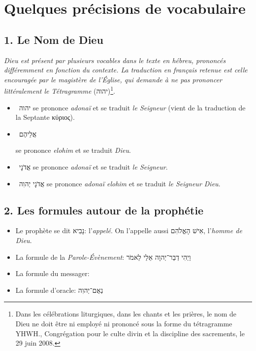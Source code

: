 \noindent
\section*{Quelques précisions de vocabulaire}

\subsection*{1. Le Nom de Dieu}
\textit{Dieu est présent par plusieurs vocables dans le texte en hébreu, prononcés différemment en fonction du contexte. La traduction en français retenue est celle encouragée par le magistère de l'Église, qui demande à ne pas prononcer littéralement le Tétragramme} (\texthebrew{יהוה})\footnote{\og{}Dans les célébrations liturgiques, dans les chants et les prières, le nom de Dieu ne doit être ni employé ni prononcé sous la forme du tétragramme YHWH.\fg{}, Congrégation pour le culte divin et la discipline des sacrements, le 29 juin 2008.}.\par
\begin{itemize}[label=] 
\item ~\texthebrew{יהוה} se prononce \textit{adonaï} et se traduit \textit{le Seigneur} (vient de la traduction de la Septante \textgreek{κύριος}).
\item ~\texthebrew{אֲלֵיהֶם} \raggedright se prononce \textit{elohim} et se traduit \textit{Dieu}.
\item ~\texthebrew{אֲדֹנָי} se prononce \textit{adonaï} et se traduit \textit{le Seigneur}.
\item ~\texthebrew{אֲדֹנָי יְהוִה} se prononce \textit{adonaï elohim} et se traduit \textit{le Seigneur Dieu}.
\end{itemize}

\subsection*{2. Les formules autour de la prophétie}
\begin{itemize}[label=] 
\item Le prophète se dit \texthebrew{נָבִיא}: l'\textit{appelé}. On l'appelle aussi \texthebrew{אִישׁ הָאֱלֹהִם}, l'\textit{homme de Dieu}.
\item La formule de la \textit{Parole-Évènement}: \texthebrew{וַיְהִי דְבַר־יְהוָה אֵלַי לֵאמֹר}
\item La formule du messager: 
\item La formule d'oracle: \texthebrew{נְאֻם־יְהוִה} 
\end{itemize}